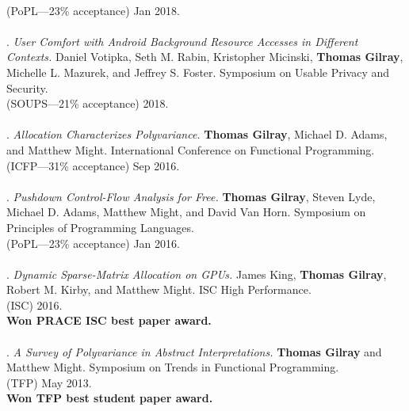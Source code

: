 \\(PoPL---23\% acceptance) Jan 2018. 
\\ \vspace{-0.1cm}\\
\paper. \textit{User Comfort with Android Background Resource Accesses in Different Contexts.}
Daniel Votipka, Seth M. Rabin, Kristopher Micinski, \textbf{Thomas Gilray}, Michelle L. Mazurek, and Jeffrey S. Foster.
Symposium on Usable Privacy and Security.
\\(SOUPS---21\% acceptance) 2018. 
\\ \vspace{-0.1cm}\\
\paper. \textit{Allocation Characterizes Polyvariance.}
\textbf{Thomas Gilray}, Michael D. Adams, and Matthew Might.
International Conference on Functional Programming.
\\(ICFP---31\% acceptance) Sep 2016. 
\\ \vspace{-0.1cm}\\
\paper. \textit{Pushdown Control-Flow Analysis for Free.}
\textbf{Thomas Gilray}, Steven Lyde, Michael D. Adams, Matthew Might, and David Van Horn.
Symposium on Principles of Programming Languages.
\\(PoPL---23\% acceptance) Jan 2016. 
\\ \vspace{-0.1cm}\\
\paper. \textit{Dynamic Sparse-Matrix Allocation on GPUs.}
James King, \textbf{Thomas Gilray}, Robert M. Kirby, and Matthew Might.
ISC High Performance.
\\(ISC) 2016. 
\\\textbf{Won PRACE ISC best paper award.} \\ \vspace{-0.1cm}\\
\paper. \textit{A Survey of Polyvariance in Abstract Interpretations.}
\textbf{Thomas Gilray} and Matthew Might.
Symposium on Trends in Functional Programming.
\\(TFP) May 2013. 
\\\textbf{Won TFP best student paper award.} \\ \vspace{-0.1cm}\\
